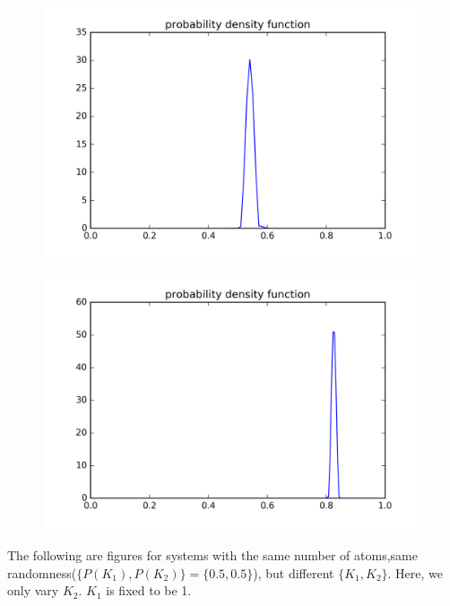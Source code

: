\begin{figure}[!htbh]
\centering
\begin{minipage}{.45\textwidth}
  \centering
  \includegraphics[width=1.1\linewidth]{Harmonic_spring_ratio/densProb_0_5N_101m_2p_98th.png}
  \label{fig:spring_N_101m_2_98th}
\end{minipage}\qquad
\begin{minipage}{.45\textwidth}
  \centering
  \includegraphics[width=1.1\linewidth]{Harmonic_spring_ratio/densProb_0_5N_201m_2p_198th.png}
  \label{fig:spring_N_201m_2_198th}
\end{minipage}
\end{figure}


\newpage
The following are figures for systems with the same number of atoms,same randomness($\{P(K_1),P(K_2) \}= \{0.5,0.5\} $), but different $\{K_1, K_2\}$. Here, we only vary $K_2$. $K_1$ is fixed to be 1. 



